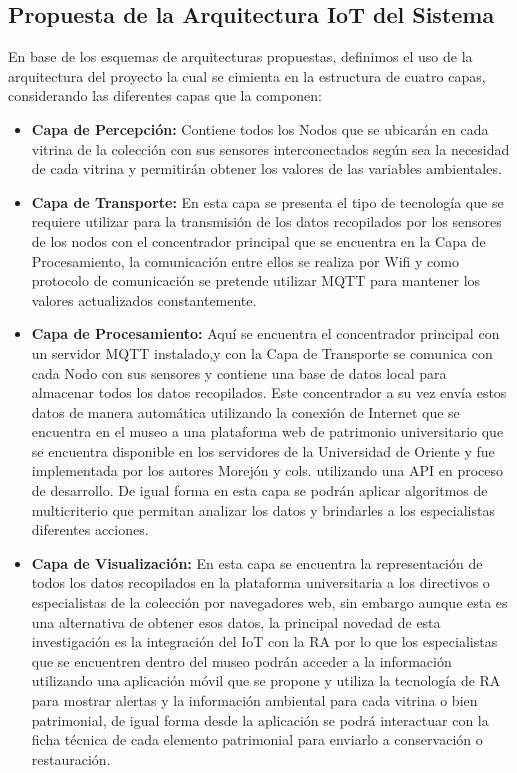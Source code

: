     \subsection{Propuesta de la Arquitectura IoT del Sistema}

    En base de los esquemas de arquitecturas propuestas, definimos el uso de la arquitectura del proyecto la cual se cimienta en la estructura de cuatro capas, considerando las diferentes capas que la componen:
    
    \begin{itemize}
        \item \textbf{Capa de Percepción: }Contiene todos los Nodos que se ubicarán en cada vitrina de la colección con sus sensores interconectados según sea la necesidad de cada vitrina y permitirán obtener los valores de las variables ambientales.
        \item \textbf{Capa de Transporte: }En esta capa se presenta el tipo de tecnología que se requiere utilizar para la transmisión de los datos recopilados por los sensores de los nodos con el concentrador principal que se encuentra en la Capa de Procesamiento, la comunicación entre ellos se realiza por Wifi y como protocolo de comunicación se pretende utilizar MQTT para mantener los valores actualizados constantemente.
        \item \textbf{Capa de Procesamiento: }Aquí se encuentra el concentrador principal con un servidor MQTT instalado,y con la Capa de Transporte se comunica con cada Nodo con sus sensores y contiene una base de datos local para almacenar todos los datos recopilados. Este concentrador a su vez envía estos datos de manera automática utilizando la conexión de Internet que se encuentra en el museo a una plataforma web de patrimonio universitario que se encuentra disponible en los servidores de la Universidad de Oriente y fue implementada por los autores Morejón y cols.\cite{morejon} utilizando una API en proceso de desarrollo. De igual forma en esta capa se podrán aplicar algoritmos de multicriterio que permitan analizar los datos y brindarles a los especialistas diferentes acciones.
        \item \textbf{Capa de Visualización: }En esta capa se encuentra la representación de todos los datos recopilados en la plataforma universitaria a los directivos o especialistas de la colección por navegadores web, sin embargo aunque esta es una alternativa de obtener esos datos, la principal novedad de esta investigación es la integración del IoT con la RA por lo que los especialistas que se encuentren dentro del museo podrán acceder a la información utilizando una aplicación móvil que se propone y utiliza la tecnología de RA para mostrar alertas y la información ambiental para cada vitrina o bien patrimonial, de igual forma desde la aplicación se podrá interactuar con la ficha técnica de cada elemento patrimonial para enviarlo a conservación o restauración. 
    \end{itemize}


